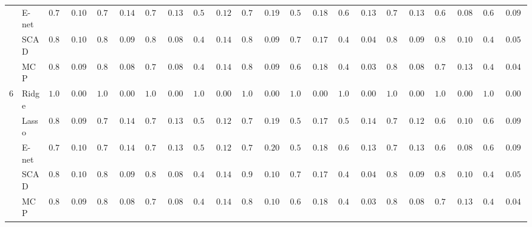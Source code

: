 \begin{tabular}{ll|ll|llllll|llllll|llllll}
 & E-net  & $0.792$ & $0.1061$ & $0.784$ & $0.1441$ & $0.716$ & $0.1369$ & $0.542$ & $0.1216$ & $0.766$ & $0.1950$ & $0.528$ & $0.1875$ & $0.668$ & $0.1309$ & $0.772$ & $0.1334$ & $0.640$ & $0.0899$ & $0.642$ & $0.0955$ \\
 & SCAD  & $0.894$ & $0.1003$ & $0.872$ & $0.0965$ & $0.840$ & $0.0804$ & $0.470$ & $0.1460$ & $0.888$ & $0.0998$ & $0.750$ & $0.1714$ & $0.410$ & $0.0438$ & $0.882$ & $0.0989$ & $0.800$ & $0.1064$ & $0.414$ & $0.0586$ \\
 & MCP  & $0.864$ & $0.0938$ & $0.842$ & $0.0819$ & $0.794$ & $0.0827$ & $0.448$ & $0.1425$ & $0.866$ & $0.0945$ & $0.694$ & $0.1852$ & $0.408$ & $0.0394$ & $0.850$ & $0.0870$ & $0.756$ & $0.1351$ & $0.404$ & $0.0400$ \\\hline
6 & Ridge  & $1.000$ & $0.0000$ & $1.000$ & $0.0000$ & $1.000$ & $0.0000$ & $1.000$ & $0.0000$ & $1.000$ & $0.0000$ & $1.000$ & $0.0000$ & $1.000$ & $0.0000$ & $1.000$ & $0.0000$ & $1.000$ & $0.0000$ & $1.000$ & $0.0000$ \\
 & Lasso  & $0.816$ & $0.0972$ & $0.794$ & $0.1434$ & $0.732$ & $0.1399$ & $0.534$ & $0.1241$ & $0.780$ & $0.1959$ & $0.534$ & $0.1799$ & $0.544$ & $0.1479$ & $0.788$ & $0.1297$ & $0.646$ & $0.1096$ & $0.610$ & $0.0916$ \\
 & E-net  & $0.792$ & $0.1061$ & $0.784$ & $0.1441$ & $0.716$ & $0.1369$ & $0.542$ & $0.1216$ & $0.754$ & $0.2047$ & $0.528$ & $0.1875$ & $0.668$ & $0.1309$ & $0.772$ & $0.1334$ & $0.640$ & $0.0899$ & $0.642$ & $0.0955$ \\
 & SCAD  & $0.894$ & $0.1003$ & $0.872$ & $0.0965$ & $0.840$ & $0.0804$ & $0.470$ & $0.1460$ & $0.900$ & $0.1005$ & $0.750$ & $0.1714$ & $0.410$ & $0.0438$ & $0.882$ & $0.0989$ & $0.800$ & $0.1064$ & $0.414$ & $0.0586$ \\
 & MCP  & $0.864$ & $0.0938$ & $0.842$ & $0.0819$ & $0.794$ & $0.0827$ & $0.448$ & $0.1425$ & $0.864$ & $0.1059$ & $0.694$ & $0.1852$ & $0.408$ & $0.0394$ & $0.850$ & $0.0870$ & $0.756$ & $0.1351$ & $0.404$ & $0.0400$ \\
\hline 
\end{tabular}

